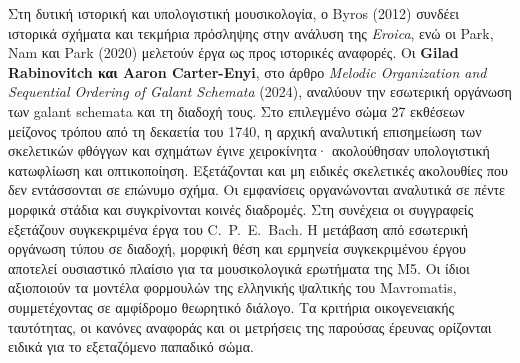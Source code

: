 \documentclass[11pt,a4paper]{article}
\begin{document}
Στη δυτική ιστορική και υπολογιστική μουσικολογία, ο Byros (2012) συνδέει ιστορικά σχήματα και τεκμήρια πρόσληψης στην ανάλυση της \emph{Eroica}, ενώ οι Park, Nam και Park (2020) μελετούν έργα ως προς ιστορικές αναφορές. Οι \textbf{Gilad Rabinovitch και Aaron Carter-Enyi}, στο άρθρο \emph{Melodic Organization and Sequential Ordering of Galant Schemata} (2024), αναλύουν την εσωτερική οργάνωση των galant schemata και τη διαδοχή τους. Στο επιλεγμένο σώμα 27 εκθέσεων μείζονος τρόπου από τη δεκαετία του 1740, η αρχική αναλυτική επισημείωση των σκελετικών φθόγγων και σχημάτων έγινε χειροκίνητα· ακολούθησαν υπολογιστική κατωφλίωση και οπτικοποίηση. Εξετάζονται και μη ειδικές σκελετικές ακολουθίες που δεν εντάσσονται σε επώνυμο σχήμα. Οι εμφανίσεις οργανώνονται αναλυτικά σε πέντε μορφικά στάδια και συγκρίνονται κοινές διαδρομές. Στη συνέχεια οι συγγραφείς εξετάζουν συγκεκριμένα έργα του C.~P.~E.~Bach. Η μετάβαση από εσωτερική οργάνωση τύπου σε διαδοχή, μορφική θέση και ερμηνεία συγκεκριμένου έργου αποτελεί ουσιαστικό πλαίσιο για τα μουσικολογικά ερωτήματα της M5. Οι ίδιοι αξιοποιούν τα μοντέλα φορμουλών της ελληνικής ψαλτικής του Mavromatis, συμμετέχοντας σε αμφίδρομο θεωρητικό διάλογο. Τα κριτήρια οικογενειακής ταυτότητας, οι κανόνες αναφοράς και οι μετρήσεις της παρούσας έρευνας ορίζονται ειδικά για το εξεταζόμενο παπαδικό σώμα.
\end{document}
